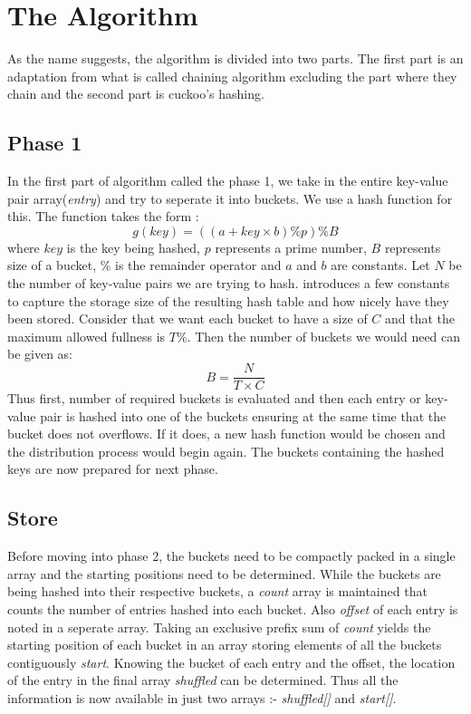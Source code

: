 \documentclass[a4paper,12pt]{report}
\begin{document}
\section{The Algorithm}
As the name suggests, the algorithm is divided into two parts. The first part is an adaptation from what is called 
chaining algorithm excluding the part where they chain and the second part is cuckoo's hashing. 
\subsection{Phase 1}
In the first part of algorithm called the phase 1, we take in the entire key-value pair array(\textit{entry}) and 
try to seperate it into buckets. We use a hash function for this. The function takes the form :
$$ g(key) = ((a+key \times b) \% p ) \% B $$
where $key$ is the key being hashed, $p$ represents a prime number, $B$ represents size of a bucket, $\%$ is the
 remainder operator and $a$ and $b$ are constants. Let $N$ be the number of key-value pairs we are trying to hash.
 \cite{1} introduces a few constants to capture the storage size of the resulting hash table and how nicely have they 
been stored. Consider that we want each bucket to have a size of $C$ and that the maximum allowed fullness is $T \% $. 
Then the number of buckets we would need can be given as:
$$ B = \frac{N}{T \times C}$$
Thus first, number of required buckets is evaluated and then each entry or key-value pair is hashed into one of the
 buckets ensuring at the same time that the bucket does not overflows. If it does, a new hash function would be chosen 
and the distribution process would begin again. The buckets containing the hashed keys are now prepared for next phase.
\subsection{Store}
Before moving into phase 2, the buckets need to be compactly packed in a single array and the starting positions need
 to be determined. While the buckets are being hashed into their respective buckets, a \textit{count} array is maintained
 that counts the number of entries hashed into each bucket. Also \textit{offset} of each entry is noted in a seperate 
array. Taking an exclusive prefix sum of \textit{count} yields the starting position of each bucket in an array storing 
elements of all the buckets contiguously \textit{start}. Knowing the bucket of each entry and the offset, the location 
of the entry in the final array \textit{shuffled} can be determined. Thus all the information is now available in just
 two arrays :- \textit{shuffled[]} and \textit{start[]}.
\end{document}
